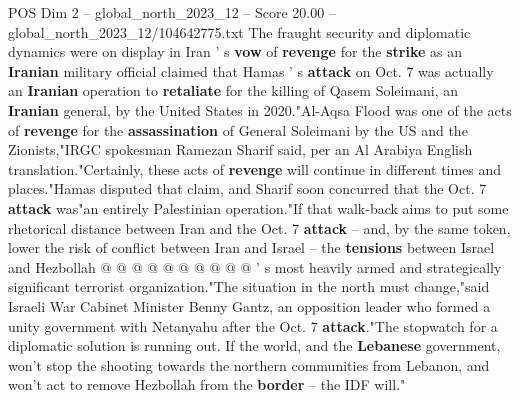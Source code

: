 \begin{textsample}{POS Dim 2 – global\_north\_2023\_12 – Score 20.00 – global\_north\_2023\_12/104642775.txt}
The fraught security and diplomatic dynamics were on display in Iran ' s \textbf{vow} of \textbf{revenge} for the \textbf{strike} as an \textbf{Iranian} military official claimed that Hamas ' s \textbf{attack} on Oct. 7 was actually an \textbf{Iranian} operation to \textbf{retaliate} for the killing of Qasem Soleimani, an \textbf{Iranian} general, by the United States in 2020."Al-Aqsa Flood was one of the acts of \textbf{revenge} for the \textbf{assassination} of General Soleimani by the US and the Zionists,"IRGC spokesman Ramezan Sharif said, per an Al Arabiya English translation."Certainly, these acts of \textbf{revenge} will continue in different times and places."Hamas disputed that claim, and Sharif soon concurred that the Oct. 7 \textbf{attack} was"an entirely Palestinian operation."If that walk-back aims to put some rhetorical distance between Iran and the Oct. 7 \textbf{attack} -- and, by the same token, lower the risk of conflict between Iran and Israel -- the \textbf{tensions} between Israel and Hezbollah @ @ @ @ @ @ @ @ @ @ ' s most heavily armed and strategically significant terrorist organization."The situation in the north must change,"said Israeli War Cabinet Minister Benny Gantz, an opposition leader who formed a unity government with Netanyahu after the Oct. 7 \textbf{attack}."The stopwatch for a diplomatic solution is running out.
If the world, and the \textbf{Lebanese} government, won't stop the shooting towards the northern communities from Lebanon, and won't act to remove Hezbollah from the \textbf{border} -- the IDF will."

\end{textsample}
